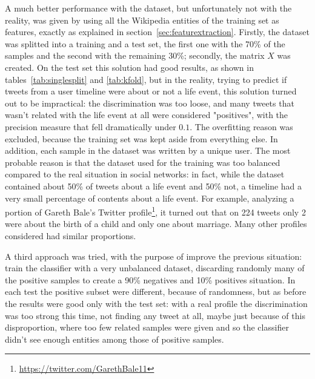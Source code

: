 A much better performance with the dataset, but unfortunately not with the reality, was given by using all the Wikipedia entities of the training set as features, exactly as explained in section~\ref{sec:featurextraction}. Firstly, the dataset was splitted into a training and a test set, the first one with the 70\% of the samples and the second with the remaining 30\%; secondly, the matrix $X$ was created. On the test set this solution had good results, as shown in tables~\ref{tab:singlesplit} and \ref{tab:kfold}, but in the reality, trying to predict if tweets from a user timeline were about or not a life event, this solution turned out to be impractical: the discrimination was too loose, and many tweets that wasn't related with the life event at all were considered "positives", with the precision measure that fell dramatically under $0.1$. The overfitting reason was excluded, because the training set was kept aside from everything else. In addition, each sample in the dataset was written by a unique user. The most probable reason is that the dataset used for the training was too balanced compared to the real situation in social networks: in fact, while the dataset contained about 50\% of tweets about a life event and 50\% not, a timeline had a very small percentage of contents about a life event. For example, analyzing a portion of Gareth Bale's Twitter profile\footnote{\url{https://twitter.com/GarethBale11}}, it turned out that on 224 tweets only 2 were about the birth of a child and only one about marriage. Many other profiles considered had similar proportions.

A third approach was tried, with the purpose of improve the previous situation: train the classifier with a very unbalanced dataset, discarding randomly many of the positive samples to create a 90\% negatives and 10\% positives situation. In each test the positive subset were different, because of randomness, but as before the results were good only with the test set: with a real profile the discrimination was too strong this time, not finding any tweet at all, maybe just because of this disproportion, where too few related samples were given and so the classifier didn't see enough entities among those of positive samples.

